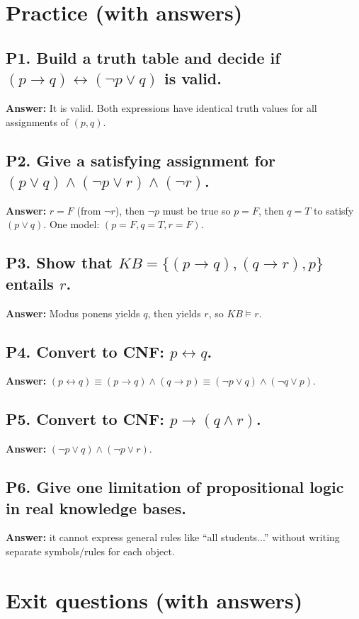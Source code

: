 \documentclass[11pt]{article}
\begin{document}
\section{Practice (with answers)}
\subsection*{P1. Build a truth table and decide if $(p\rightarrow q)\leftrightarrow(\lnot p \lor q)$ is valid.}
\textbf{Answer:} It is valid. Both expressions have identical truth values for all assignments of $(p,q)$.

\subsection*{P2. Give a satisfying assignment for $(p \lor q)\land (\lnot p \lor r)\land (\lnot r)$.}
\textbf{Answer:} $r=F$ (from $\lnot r$), then $\lnot p$ must be true so $p=F$, then $q=T$ to satisfy $(p\lor q)$. One model: $(p=F,q=T,r=F)$.

\subsection*{P3. Show that $KB=\{(p\rightarrow q),(q\rightarrow r),p\}$ entails $r$.}
\textbf{Answer:} Modus ponens yields $q$, then yields $r$, so $KB\models r$.

\subsection*{P4. Convert to CNF: $p \leftrightarrow q$.}
\textbf{Answer:} $(p\leftrightarrow q)\equiv (p\rightarrow q)\land(q\rightarrow p)\equiv (\lnot p\lor q)\land(\lnot q\lor p)$.

\subsection*{P5. Convert to CNF: $p \rightarrow (q \land r)$.}
\textbf{Answer:} $(\lnot p\lor q)\land(\lnot p\lor r)$.

\subsection*{P6. Give one limitation of propositional logic in real knowledge bases.}
\textbf{Answer:} it cannot express general rules like ``all students...'' without writing separate symbols/rules for each object.

\section{Exit questions (with answers)}
\end{document}
